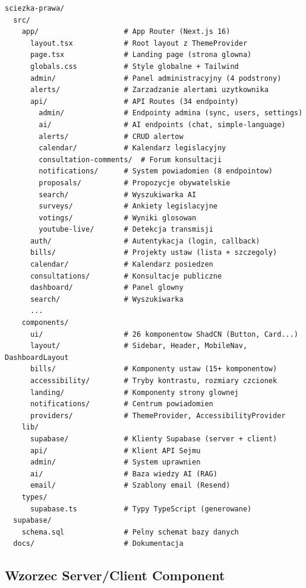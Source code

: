 \documentclass[12pt,a4paper]{article}
\begin{document}
\begin{lstlisting}[style=typescript, title=Struktura katalogów projektu]
sciezka-prawa/
  src/
    app/                    # App Router (Next.js 16)
      layout.tsx            # Root layout z ThemeProvider
      page.tsx              # Landing page (strona glowna)
      globals.css           # Style globalne + Tailwind
      admin/                # Panel administracyjny (4 podstrony)
      alerts/               # Zarzadzanie alertami uzytkownika
      api/                  # API Routes (34 endpointy)
        admin/              # Endpointy admina (sync, users, settings)
        ai/                 # AI endpoints (chat, simple-language)
        alerts/             # CRUD alertow
        calendar/           # Kalendarz legislacyjny
        consultation-comments/  # Forum konsultacji
        notifications/      # System powiadomien (8 endpointow)
        proposals/          # Propozycje obywatelskie
        search/             # Wyszukiwarka AI
        surveys/            # Ankiety legislacyjne
        votings/            # Wyniki glosowan
        youtube-live/       # Detekcja transmisji
      auth/                 # Autentykacja (login, callback)
      bills/                # Projekty ustaw (lista + szczegoly)
      calendar/             # Kalendarz posiedzen
      consultations/        # Konsultacje publiczne
      dashboard/            # Panel glowny
      search/               # Wyszukiwarka
      ...
    components/
      ui/                   # 26 komponentow ShadCN (Button, Card...)
      layout/               # Sidebar, Header, MobileNav, DashboardLayout
      bills/                # Komponenty ustaw (15+ komponentow)
      accessibility/        # Tryby kontrastu, rozmiary czcionek
      landing/              # Komponenty strony glownej
      notifications/        # Centrum powiadomien
      providers/            # ThemeProvider, AccessibilityProvider
    lib/
      supabase/             # Klienty Supabase (server + client)
      api/                  # Klient API Sejmu
      admin/                # System uprawnien
      ai/                   # Baza wiedzy AI (RAG)
      email/                # Szablony email (Resend)
    types/
      supabase.ts           # Typy TypeScript (generowane)
  supabase/
    schema.sql              # Pelny schemat bazy danych
  docs/                     # Dokumentacja
\end{lstlisting}

\subsection{Wzorzec Server/Client Component}
\end{document}
